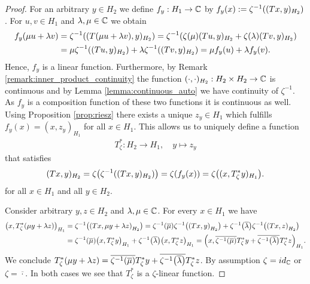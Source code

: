 \begin{proof}
	For an arbitrary $y \in H_2$ we define $f_y: H_1 \to \mathbb{C}$ by $f_y (x) := \zeta^{-1}{\left ( (Tx,y)_{H_2} \right )}$. For $u,v \in H_1$ and $\lambda, \mu \in \mathbb{C}$ we obtain
	\begin{align*}
		f_y(\mu u + \lambda v) &= \zeta^{-1}{\left ( (T(\mu u + \lambda v), y)_{H_2} \right )} = \zeta^{-1}{\left ( \zeta(\mu) (Tu, y)_{H_2} + \zeta(\lambda) (Tv, y)_{H_2} \right )} \\
		&= \mu \zeta^{-1}{\left ( (Tu,y)_{H_2} \right )} + \lambda \zeta^{-1}{\left ( (Tv,y)_{H_2} \right )} = \mu f_y(u) + \lambda f_y(v).
	\end{align*}
	Hence, $f_y$ is a linear function. Furthermore, by Remark \ref{remark:inner_product_continuity} the function $(\cdot, \cdot)_{H_2}: H_2 \times H_2 \to \mathbb{C}$ is continuous and by Lemma \ref{lemma:continuous_auto} we have continuity of $\zeta^{-1}$. As $f_y$ is a composition function of these two functions it is continuous as well. Using Proposition \ref{prop:riesz} there exists a unique $z_y \in H_1$ which fulfills $f_y(x) = (x,z_y)_{H_1}$ for all $x \in H_1$. This allows us to uniquely define a function
	\begin{align*}
		T_\zeta^\ast: H_2 \to H_1, \quad y \mapsto z_y
	\end{align*}
	that satisfies
	\begin{align*}
		(Tx,y)_{H_2} = \zeta{\left ( \zeta^{-1}{\left ( (Tx,y)_{H_2} \right )} \right )} = \zeta{\left ( f_y(x) \right )} = \zeta {\left ( (x, T_\zeta^\ast y)_{H_1} \right )}.
	\end{align*}
	for all $x \in H_1$ and all $y \in H_2$.
	
	Consider arbitrary $y,z \in H_2$ and $\lambda, \mu \in \mathbb{C}$. For every $x \in H_1$ we have
	\begin{align*}
		{\left ( x, T_\zeta^\ast {\left ( \mu y + \lambda z \right )} \right )}_{H_1} &= \zeta^{-1}{\left ( {\left ( Tx, \mu y + \lambda z \right )}_{H_2} \right )} = \zeta^{-1}{\left ( \overline{\mu} \right )} \zeta^{-1}{\left ( {\left ( Tx, y \right )}_{H_2} \right )} + \zeta^{-1}{\left ( \overline{\lambda} \right )} \zeta^{-1}{\left ( {\left ( Tx, z \right )}_{H_2} \right )} \\
		&= \zeta^{-1}{\left ( \overline{\mu} \right )} {\left ( x, T_\zeta^\ast y \right )}_{H_1} + \zeta^{-1}{\left ( \overline{\lambda} \right )} {\left ( x, T_\zeta^\ast z \right )}_{H_1} = {\left ( x, \overline{\zeta^{-1}{\left ( \overline{\mu} \right )}}T_\zeta^\ast y + \overline{\zeta^{-1}{\left ( \overline{\lambda} \right )}}T_\zeta^\ast z \right )}_{H_1}.
	\end{align*}
	We conclude $T_\zeta^\ast {\left ( \mu y + \lambda z \right )} = \overline{\zeta^{-1}{\left ( \overline{\mu} \right )}}T_\zeta^\ast y + \overline{\zeta^{-1}{\left ( \overline{\lambda} \right )}}T_\zeta^\ast z$. By assumption $\zeta = id_{\mathbb{C}}$ or $\zeta = \overline{\cdot}$. In both cases we see that $T_\zeta^\ast$ is a $\zeta$-linear function.
\end{proof}


